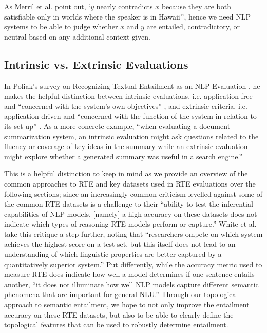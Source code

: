 \documentclass[12pt,twoside]{report}
\begin{document}
As Merril et al. point out, `$y$ nearly contradicts $x$ because they are both satisfiable only in worlds where the speaker is in Hawaii'', hence we need NLP systems to be able to judge whether $x$ and $y$ are entailed, contradictory, or neutral based on any additional context given. 

\subsection{Intrinsic vs. Extrinsic Evaluations}

In Poliak's survey on Recognizing Textual Entailment as an NLP Evaluation \cite{poliak-2020-survey}, he makes the helpful distinction between intrinsic evaluations, i.e. application-free and ``concerned with the system’s own objectives'' \cite{estival1997}, and extrinsic criteria, i.e. application-driven and ``concerned with the function of the system in relation to its set-up'' \cite{estival1997}. As a more concrete example, ``when evaluating a document summarization system, an intrinsic evaluation might ask questions related to the fluency or coverage of key ideas in the summary while an extrinsic evaluation might explore whether a generated summary was useful in a search engine.'' \cite{poliak-2020-survey} \newline \par

This is a helpful distinction to keep in mind as we provide an overview of the common approaches to RTE and key datasets used in RTE evaluations over the following sections; since an increasingly common criticism levelled against some of the common RTE datasets is a challenge to their ``ability to test the inferential capabilities of NLP models, [namely] a high accuracy on these datasets does not indicate which types of reasoning RTE models perform or capture.'' \cite{poliak-2020-survey} White et al. take this critique a step further, noting that ``researchers ompete on which system achieves the highest score on a test set, but this itself does not lead to an understanding of which linguistic properties are better captured by a quantitatively superior system.'' \cite{white-etal-2017-inference} Put differently, while the accuracy metric used to measure RTE does indicate how well a model determines if one sentence entails another, ``it does not illuminate how well NLP models capture different semantic phenomena that are important for general NLU.'' \cite{poliak-2020-survey} Through our topological approach to semantic entailment, we hope to not only improve the entailment accuracy on these RTE datasets, but also to be able to clearly define the topological features that can be used to robustly determine entailment.
\end{document}
